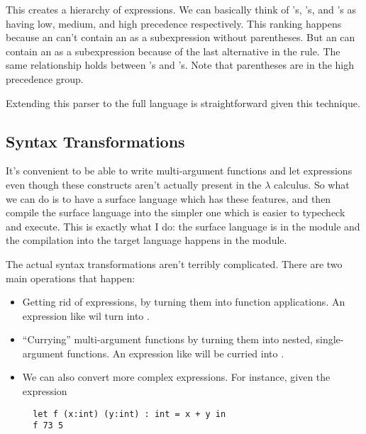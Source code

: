 \message{ !name(report.tex)}\documentclass[pageno]{jpaper}
\begin{document}
{{{\begin{figure}
\begin{lstlisting}
\end{lstlisting}
\end{figure}
\FloatBarrier

This creates a hierarchy of expressions.  We can basically think of 's, 's, and 's as having low, medium, and high precedence respectively.
This ranking happens because an  can't contain an  as a subexpression without
parentheses. But an  can contain an  as a subexpression because of the last
alternative in the  rule.  The same relationship holds between 's and
's.  Note that parentheses are in the high precedence group.

Extending this parser to the full language is straightforward given this technique.


\subsection{Syntax Transformations}

It's convenient to be able to write multi-argument functions and let expressions
even though these constructs aren't actually present in the $\lambda$ calculus.
So what we can do is to have a surface language which has these features, and then compile
the surface language into the simpler one which is easier to typecheck and execute.
This is exactly what I do: the surface language is in the module
 and the compilation into the target language happens in the  module.

The actual syntax transformations aren't terribly complicated.
There are two main operations that happen:
\begin{itemize}
\item Getting rid of  expressions, by turning them into function applications.
An expression like  wil turn into .
\item ``Currying'' multi-argument functions by turning them into nested, single-argument functions.
An expression like  will be curried into
.
\item We can also convert more complex  expressions.
For instance, given the expression 

\begin{lstlisting}
  let f (x:int) (y:int) : int = x + y in
  f 73 5 
\end{lstlisting}
 

\end{itemize}}}}
\end{document}
